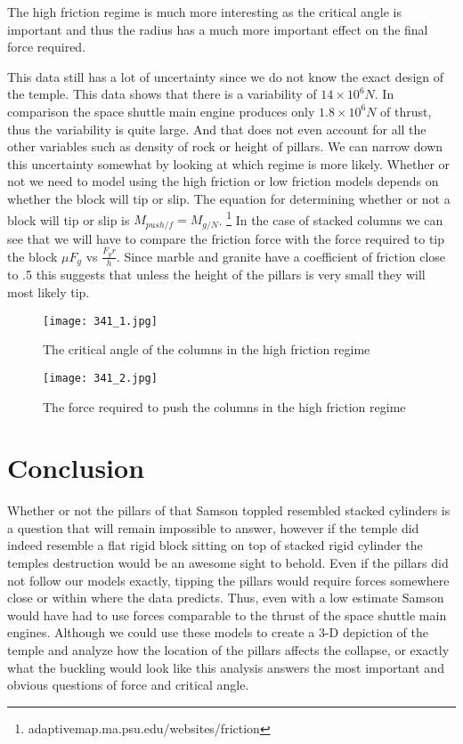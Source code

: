 \documentclass[two column]{article}
\begin{document}
The high friction regime is much more interesting as the critical angle is important and thus the radius has a much more important effect on the final force required.

This data still has a lot of uncertainty since we do not know the exact design of the temple. This data shows that there is a variability of $14\times10^6N$. In comparison the space shuttle main engine produces only $1.8\times10^6N$ of thrust, thus the variability is quite large. And that does not even account for all the other variables such as density of rock or height of pillars. We can narrow down this uncertainty somewhat by looking at which regime is more likely. Whether or not we need to model using the high friction or low friction models depends on whether the block will tip or slip. The equation for determining whether or not a block will tip or slip is $M_{push/f}=M_{g/N}$. \footnote{adaptivemap.ma.psu.edu/websites/friction} In the case of stacked columns we can see that we will have to compare the friction force with the force required to tip the block $\mu F_g$ vs $\frac{F_{g}r}{h}$. Since marble and granite have a coefficient of friction close to .5 this suggests that unless the height of the pillars is very small they will most likely tip.

\begin{figure}[h]
\texttt{[image: 341\_1.jpg]}
\caption{The critical angle of the columns in the high friction regime}
\end{figure}

\begin{figure}[h]
\texttt{[image: 341\_2.jpg]}
\caption{The force required to push the columns in the high friction regime}
\end{figure}

\section{Conclusion}
Whether or not the pillars of that Samson toppled resembled stacked cylinders is a question that will remain impossible to answer, however if the temple did indeed resemble a flat rigid block sitting on top of stacked rigid cylinder the temples destruction would be an awesome sight to behold. Even if the pillars did not follow our models exactly, tipping the pillars would require forces somewhere close or within where the data predicts. Thus, even with a low estimate Samson would have had to use forces comparable to the thrust of the space shuttle main engines. Although we could use these models to create a 3-D depiction of the temple and analyze how the location of the pillars affects the collapse, or exactly what the buckling would look like this analysis answers the most important and obvious questions of force and critical angle.
\end{document}
